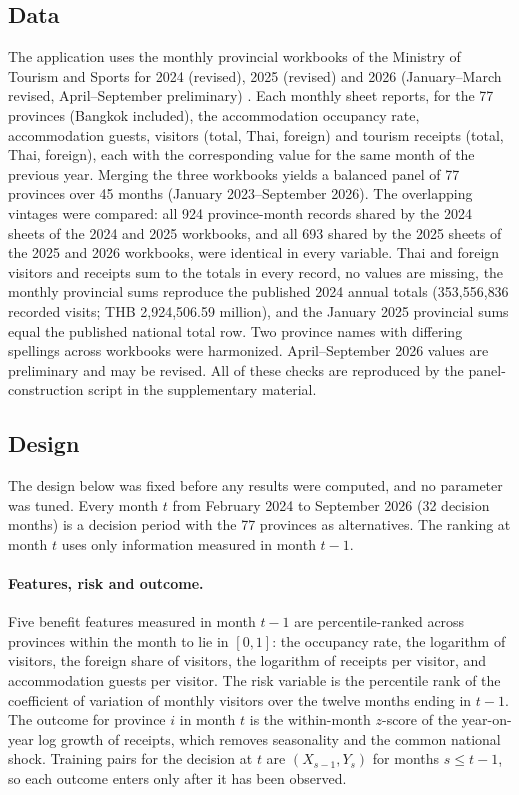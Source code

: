 \documentclass[12pt,a4paper]{article}
\begin{document}
\subsection{Data}
The application uses the monthly provincial workbooks of the Ministry of Tourism and Sports for 2024 (revised), 2025 (revised) and 2026 (January--March revised, April--September preliminary) \citep{mots2026}. Each monthly sheet reports, for the 77 provinces (Bangkok included), the accommodation occupancy rate, accommodation guests, visitors (total, Thai, foreign) and tourism receipts (total, Thai, foreign), each with the corresponding value for the same month of the previous year. Merging the three workbooks yields a balanced panel of 77 provinces over 45 months (January 2023--September 2026). The overlapping vintages were compared: all 924 province-month records shared by the 2024 sheets of the 2024 and 2025 workbooks, and all 693 shared by the 2025 sheets of the 2025 and 2026 workbooks, were identical in every variable. Thai and foreign visitors and receipts sum to the totals in every record, no values are missing, the monthly provincial sums reproduce the published 2024 annual totals (353{,}556{,}836 recorded visits; THB 2{,}924{,}506.59 million), and the January 2025 provincial sums equal the published national total row. Two province names with differing spellings across workbooks were harmonized. April--September 2026 values are preliminary and may be revised. All of these checks are reproduced by the panel-construction script in the supplementary material.

\subsection{Design}
The design below was fixed before any results were computed, and no parameter was tuned. Every month $t$ from February 2024 to September 2026 (32 decision months) is a decision period with the 77 provinces as alternatives. The ranking at month $t$ uses only information measured in month $t-1$.

\paragraph{Features, risk and outcome.} Five benefit features measured in month $t-1$ are percentile-ranked across provinces within the month to lie in $[0,1]$: the occupancy rate, the logarithm of visitors, the foreign share of visitors, the logarithm of receipts per visitor, and accommodation guests per visitor. The risk variable is the percentile rank of the coefficient of variation of monthly visitors over the twelve months ending in $t-1$. The outcome for province $i$ in month $t$ is the within-month $z$-score of the year-on-year log growth of receipts, which removes seasonality and the common national shock. Training pairs for the decision at $t$ are $(X_{s-1},Y_s)$ for months $s\le t-1$, so each outcome enters only after it has been observed.
\end{document}
